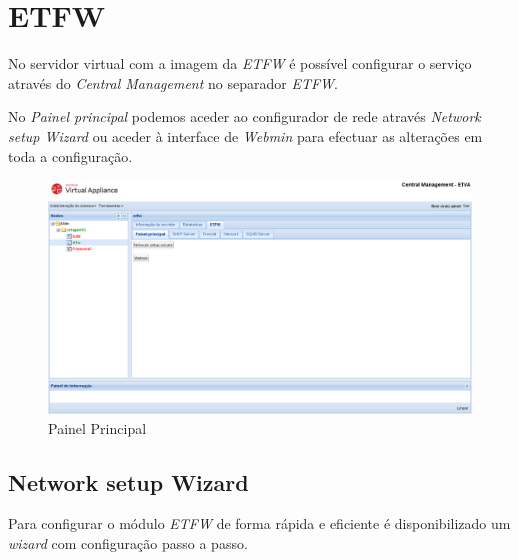 \section{ETFW}

No servidor virtual com a imagem da \textit{ETFW} é possível configurar o serviço através do \textit{Central Management} no separador \textit{ETFW}.

No \textit{Painel principal} podemos aceder ao configurador de rede através \textit{Network setup Wizard} ou aceder à interface de \textit{Webmin} para efectuar as alterações em toda a configuração.

\begin{figure}[H]
    \begin{center}
    \includegraphics[scale=0.38]{screenshots/etfw/etfwmain.png}
    \caption{Painel Principal}
    \label{fig:etfwmain}
    \end{center}
\end{figure}

\subsection{Network setup Wizard}

Para configurar o módulo \textit{ETFW} de forma rápida e eficiente é disponibilizado um \textit{wizard} com configuração passo a passo.

